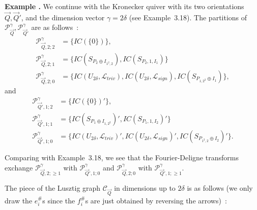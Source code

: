 \documentclass[a4paper,10pt]{amsart}
\numberwithin{equation}{section}
\begin{document}
\vspace{.2in}

\addtocounter{theo}{1}
\noindent \textbf{Example \thetheo .} We continue with the Kronecker quiver with its two orientations $\vec{Q},\vec{Q}'$, and the dimension vector $\gamma=2\delta$ (see Example~3.18). The partitions of $\mathcal{P}_{\vec{Q}}^{\gamma}, \mathcal{P}_{\vec{Q}'}^{\gamma}$ are as follows~:
\begin{align*}
\mathcal{P}_{\vec{Q},2;2}^{\gamma}&=\big\{ IC(\{0\})\big\},\\
\mathcal{P}^{\gamma}_{\vec{Q},2;1}&=\big\{ IC(S_{P_2 \oplus I_{1^2,2}}), IC(S_{P_2,1,I_1})\big\}\\
\mathcal{P}^{\gamma}_{\vec{Q},2;0}&=\big\{IC(U_{2\delta},\mathcal{L}_{triv}), IC(U_{2\delta},\mathcal{L}_{sign}), IC(S_{P_{1,2^2} \oplus I_1})\big\},
\end{align*}
and
\begin{align*}
\mathcal{P}^{\gamma}_{\vec{Q}',1;2}&=\big\{ IC(\{0\})'\big\},\\
\mathcal{P}^{\gamma}_{\vec{Q}',1;1}&=\big\{ IC(S_{P_1 \oplus I_{1,2^2}})', IC(S_{P_1,1,I_2})'\big\}\\
\mathcal{P}^{\gamma}_{\vec{Q}',1;0}&=\big\{IC(U_{2\delta},\mathcal{L}_{triv})', IC(U_{2\delta},\mathcal{L}_{sign})', IC(S_{P_{1^2,2} \oplus I_2})'\big\}.
\end{align*}

\vspace{.1in}

Comparing with Example~3.18, we see that the Fourier-Deligne transforms exchange $\mathcal{P}^{\gamma}_{\vec{Q},2; \geq 1}$ with $\mathcal{P}^{\gamma}_{\vec{Q}',1; 0}$ and $\mathcal{P}^{\gamma}_{\vec{Q},2; 0}$ with $\mathcal{P}^{\gamma}_{\vec{Q}',1; \geq 1}$.   

\vspace{.1in}

The piece of the Lusztig graph $\mathcal{C}_{\vec{Q}}$ in dimensions up to $2\delta$ is as follows (we only draw the $e_i^\#$s since the $f_i^\#$s are just obtained by reversing the arrows)~:
\end{document}
